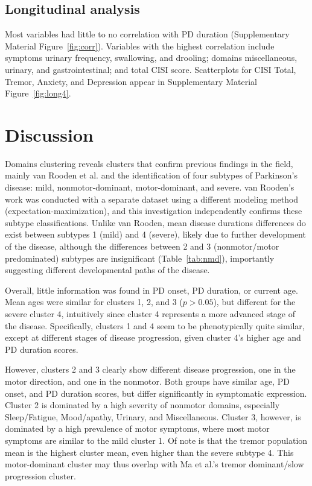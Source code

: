 \documentclass[preprint,5p]{elsarticle} %
\begin{document}
\subsection{Longitudinal analysis}

Most variables had little to no correlation with PD duration (Supplementary Material Figure~\ref{fig:corr}). Variables
with the highest correlation include symptoms urinary frequency, swallowing, and drooling; domains
miscellaneous, urinary, and gastrointestinal; and total CISI score. Scatterplots for CISI Total,
Tremor, Anxiety, and Depression appear in Supplementary Material Figure~\ref{fig:long4}.

\section{Discussion}

Domains clustering reveals clusters that confirm previous
findings in the field, mainly van Rooden et al.\cite{vanrooden11} and the identification of four
subtypes of Parkinson's disease: mild, nonmotor-dominant, motor-dominant, and severe. van
Rooden's work was conducted with a separate dataset using a different modeling method
(expectation-maximization), and this investigation independently confirms these subtype
classifications. Unlike van Rooden, mean disease durations differences do exist between subtypes 1
(mild) and 4 (severe), likely due to further development of the disease, although the differences
between 2 and 3 (nonmotor/motor predominated) subtypes are insignificant
(Table~\ref{tab:nmd}), importantly suggesting different developmental paths of the disease.

Overall, little information was found in PD onset, PD duration, or current age. Mean ages were
similar for clusters 1, 2, and 3 ($p > 0.05$), but different for the severe cluster 4, intuitively
since cluster 4 represents a more advanced stage of the disease.  Specifically, clusters 1 and 4
seem to be phenotypically quite similar, except at different stages of disease progression, given
cluster 4's higher age and PD duration scores.

However, clusters 2 and 3 clearly show different disease progression, one in
the motor direction, and one in the nonmotor. Both groups have similar age,
PD onset, and PD duration scores, but differ significantly in symptomatic expression.
Cluster 2 is dominated by a high severity of nonmotor domains, especially Sleep/Fatigue,
Mood/apathy, Urinary, and Miscellaneous.  Cluster 3, however, is dominated by a high prevalence
of motor symptoms, where most motor symptoms are similar to the mild cluster 1. Of note is that the
tremor population mean is the highest cluster mean, even higher than the severe subtype 4. This
motor-dominant cluster may thus overlap with Ma et al.'s tremor dominant/slow progression
cluster.\cite{ma15}
\end{document}
